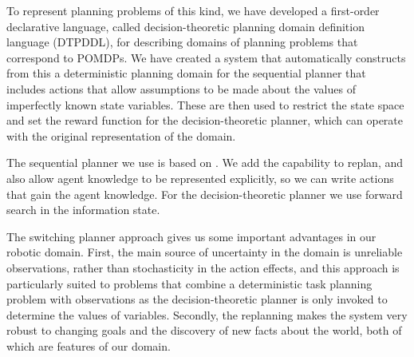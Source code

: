 To represent planning problems of this kind, we have developed a
first-order declarative language, called decision-theoretic planning
domain definition language (DTPDDL), for describing domains of
planning problems that correspond to POMDPs. We have created a system
that automatically constructs from this a deterministic planning domain
for the sequential planner that includes actions that allow
assumptions to be made about the values of imperfectly known state
variables. These are then used to restrict the state space and set the
reward function for the decision-theoretic planner, which can operate
with the original representation of the domain.

The sequential planner we use is based
on \fastdownward \cite{fast-downward}. We add the capability to
replan, and also allow agent knowledge to be represented explicitly,
so we can write actions that gain the agent knowledge. For the
decision-theoretic planner we use forward search in the information
state.

The switching planner approach gives us some important advantages in
our robotic domain. First, the main source of uncertainty in the
domain is unreliable observations, rather than stochasticity in the
action effects, and this approach is particularly suited to problems
that combine a deterministic task planning problem with observations
as the decision-theoretic planner is only invoked to determine the
values of variables. Secondly, the replanning makes the system very
robust to changing goals and the discovery of new facts about the
world, both of which are features of our domain.
















